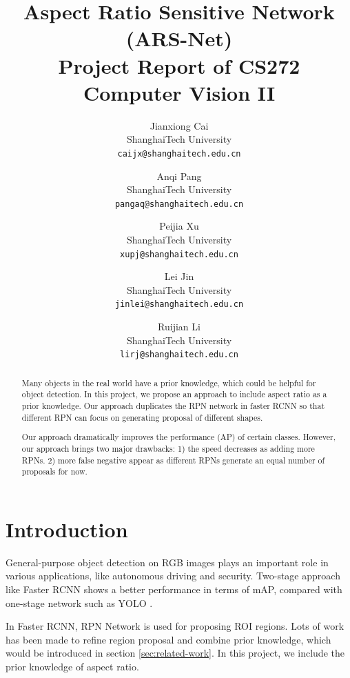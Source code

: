 \documentclass[10pt,twocolumn,letterpaper]{article}
\begin{document}
\title{Aspect Ratio Sensitive Network (ARS-Net) \\ 
\small Project Report of CS272 Computer Vision II
}

\author{Jianxiong Cai\\
ShanghaiTech University\\
{\tt\small caijx@shanghaitech.edu.cn}
\and
Anqi Pang\\
ShanghaiTech University\\
{\tt\small pangaq@shanghaitech.edu.cn}
\and
Peijia Xu\\
ShanghaiTech University\\
{\tt\small xupj@shanghaitech.edu.cn}
\and
Lei Jin\\
ShanghaiTech University\\
{\tt\small jinlei@shanghaitech.edu.cn}
\and
Ruijian Li\\
ShanghaiTech University\\
{\tt\small lirj@shanghaitech.edu.cn}
}


\maketitle

\begin{abstract}
\par
Many objects in the real world have a prior knowledge, which could be helpful for object detection. In this project, we propose an approach to include aspect ratio as a prior knowledge. Our approach duplicates the RPN network in faster RCNN \cite{fasterRCNN} so that different RPN can focus on generating proposal of different shapes.
\par
Our approach dramatically improves the performance (AP) of certain classes. However, our approach brings two major drawbacks: 1) the speed decreases as adding more RPNs. 2) more false negative appear as different RPNs generate an equal number of proposals for now.

\end{abstract}

\section{Introduction}
\par
General-purpose object detection on RGB images plays an important role in various applications, like autonomous driving and security. Two-stage approach like Faster RCNN \cite{fasterRCNN} shows a better performance in terms of mAP, compared with one-stage network such as YOLO \cite{yolo}.
\par
In Faster RCNN, RPN Network is used for proposing ROI regions. Lots of work has been made to refine region proposal and combine prior knowledge, which would be introduced in section \ref{sec:related-work}. In this project, we include the prior knowledge of aspect ratio.
\end{document}
